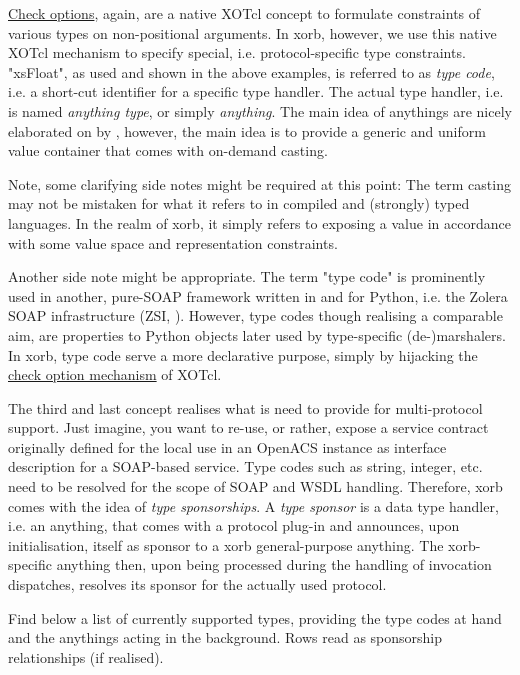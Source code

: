 \href{http://media.wu-wien.ac.at/doc/tutorial.html#non-pos-args}{Check options}, again, are a native XOTcl concept to formulate constraints of various types on non-positional arguments. In xorb, however, we use this native XOTcl mechanism to specify special, i.e. protocol-specific type constraints. "xsFloat", as used and shown in the above examples, is referred to as \emph{type code}, i.e. a short-cut identifier for a specific type handler. The actual type handler, i.e.  is named \emph{anything type}, or simply \emph{anything}. The main idea of anythings are nicely elaborated on by \cite{sommerlad:1998,maetzel:1996}, however, the main idea is to provide a generic and uniform value container that comes with on-demand casting. 
\begin{hints}
\item Note, some clarifying side notes might be required at this point: The term casting may not be mistaken for what it refers to in compiled and (strongly) typed languages. In the realm of xorb, it simply refers to exposing a value in accordance with some value space and representation constraints.
\item Another side note might be appropriate. The term "type code" is prominently used in another, pure-SOAP framework written in and for Python, i.e. the Zolera SOAP infrastructure (ZSI, \cite{zsi:2007}). However, type codes though realising a comparable aim, are properties to Python objects later used by type-specific (de-)marshalers. In xorb, type code serve a more declarative purpose, simply by hijacking the \href{http://media.wu-wien.ac.at/doc/tutorial.html#non-pos-args}{check option mechanism} of XOTcl.
\end{hints}
The third and last concept realises what is need to provide for multi-protocol support. Just imagine, you want to re-use, or rather, expose a service contract originally defined for the local use in an OpenACS instance as interface description for a SOAP-based service. Type codes such as string, integer, etc. need to be resolved for the scope of SOAP and WSDL handling. Therefore, xorb comes with the idea of \emph{type sponsorships}. A \emph{type sponsor} is a data type handler, i.e. an anything, that comes with a protocol plug-in and announces, upon initialisation, itself as sponsor to a xorb general-purpose anything. The xorb-specific anything then, upon being processed during the handling of invocation dispatches, resolves its sponsor for the actually used protocol. 

Find below a list of currently supported types, providing the type codes at hand and the anythings acting in the background. Rows read as sponsorship relationships (if realised).

